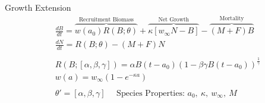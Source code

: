 \documentclass[ xcolor = pdftex, dvipsnames, table ]{beamer}
\begin{document}
%
\begin{frame}{Growth Extension}
\begin{align*}%
&\frac{dB}{dt} = \overbrace{w(a_0)R(B;\theta)}^\text{Recruitment Biomass} + \overbrace{\kappa \left[w_\infty N-B\right]}^\text{Net Growth} - \overbrace{(M+F)B}^\text{Mortality} \\%
&\frac{dN}{dt} = R(B;\theta) - (M+F)N \\%
&~\\
&R(B;[\alpha, \beta, \gamma]) = \alpha B(t-a_0)(1-\beta\gamma B(t-a_0))^{\frac{1}{\gamma}} \\%
&w(a) = w_\infty(1-e^{-\kappa a})\\ %
&~\\
&\theta' = [\alpha, \beta, \gamma] ~~~ ~~~ \text{Species Properties: } a_0,~\kappa,~w_\infty,~M
\end{align*}
\end{frame}

%
\end{document}
